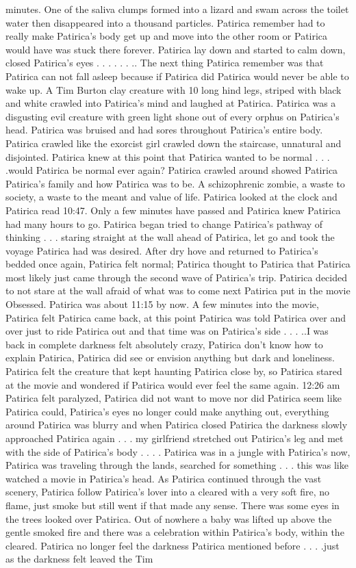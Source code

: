 \documentclass[12pt]{book}
\begin{document}
minutes. One of the saliva clumps formed into a lizard and swam across the toilet water then disappeared into a thousand particles. Patirica remember had to really make Patirica's body get up and move into the other room or Patirica would have was stuck there forever. Patirica lay down and started to calm down, closed Patirica's eyes . . .  . . . .. The next thing Patirica remember was that Patirica can not fall asleep because if Patirica did Patirica would never be able to wake up. A Tim Burton clay creature with 10 long hind legs, striped with black and white crawled into Patirica's mind and laughed at Patirica. Patirica was a disgusting evil creature with green light shone out of every orphus on Patirica's head. Patirica was bruised and had sores throughout Patirica's entire body. Patirica crawled like the exorcist girl crawled down the staircase, unnatural and disjointed. Patirica knew at this point that Patirica wanted to be normal . . . .would Patirica be normal ever again? Patirica crawled around showed Patirica Patirica's family and how Patirica was to be. A schizophrenic zombie, a waste to society, a waste to the meant and value of life. Patirica looked at the clock and Patirica read 10:47. Only a few minutes have passed and Patirica knew Patirica had many hours to go. Patirica began tried to change Patirica's pathway of thinking . . . staring straight at the wall ahead of Patirica, let go and took the voyage Patirica had was desired. After dry hove and returned to Patirica's bedded once again, Patirica felt normal; Patirica thought to Patirica that Patirica most likely just came through the second wave of Patirica's trip. Patirica decided to not stare at the wall afraid of what was to come next Patirica put in the movie Obsessed. Patirica was about 11:15 by now. A few minutes into the movie, Patirica felt Patirica came back, at this point Patirica was told Patirica over and over just to ride Patirica out and that time was on Patirica's side . . . ..I was back in complete darkness felt absolutely crazy, Patirica don't know how to explain Patirica, Patirica did see or envision anything but dark and loneliness. Patirica felt the creature that kept haunting Patirica close by, so Patirica stared at the movie and wondered if Patirica would ever feel the same again. 12:26 am Patirica felt paralyzed, Patirica did not want to move nor did Patirica seem like Patirica could, Patirica's eyes no longer could make anything out, everything around Patirica was blurry and when Patirica closed Patirica the darkness slowly approached Patirica again . . . my girlfriend stretched out Patirica's leg and met with the side of Patirica's body . . . . Patirica was in a jungle with Patirica's now, Patirica was traveling through the lands, searched for something . . . this was like watched a movie in Patirica's head. As Patirica continued through the vast scenery, Patirica follow Patirica's lover into a cleared with a very soft fire, no flame, just smoke but still went if that made any sense. There was some eyes in the trees looked over Patirica. Out of nowhere a baby was lifted up above the gentle smoked fire and there was a celebration within Patirica's body, within the cleared. Patirica no longer feel the darkness Patirica mentioned before . . . .just as the darkness felt leaved the Tim 
\end{document}
